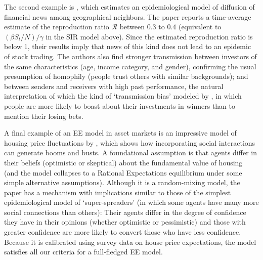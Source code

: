 The second example is , which estimates an epidemiological model of diffusion of financial news among geographical neighbors. The paper reports a time-average estimate of the reproduction ratio $\mathcal{R}$ between $0.3$ to $0.4$ (equivalent to $(\beta S_t/N)/\gamma$ in the SIR model above).  Since the estimated reproduction ratio is below  1, their results imply that news of this kind does not lead to an epidemic of stock trading.    The authors also find stronger transmission between investors of the same characteristics (age, income category, and gender), confirming the usual presumption of homophily (people trust others with similar backgrounds); and between senders and receivers with high past performance, the natural interpretation of which the kind of `transmission bias' modeled by \cite{han2022social}, in which people are more likely to boast about their investments in winners than to mention their losing bets.

A final example of an EE model in asset markets is an impressive model of housing price fluctuations by , which shows how incorporating social interactions can generate booms and busts. A foundational assumption is that agents differ in their beliefs (optimistic or skeptical) about the fundamental value of housing (and the model collapses to a Rational Expectations equilibrium under some simple alternative assumptions).  Although it is a random-mixing model, the paper has a mechanism with implications similar to those of the simplest epidemiological model of `super-spreaders' (in which some agents have many more social connections than others):  Their agents differ in the degree of confidence they have in their opinions (whether optimistic or pessimistic) and those with greater confidence are more likely to convert those who have less confidence.  Because it is calibrated using survey data on house price expectations, the model satisfies all our criteria for a full-fledged EE model. 


